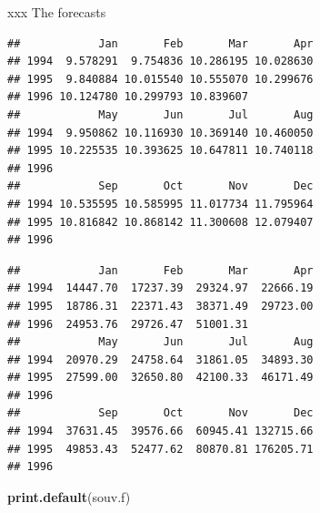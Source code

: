 \documentclass[ignorenonframetext,]{beamer}
\newenvironment{Shaded}{\begin{snugshade}}{\end{snugshade}}
\newcommand{\KeywordTok}[1]{\textcolor[rgb]{0.13,0.29,0.53}{\textbf{#1}}}
\newcommand{\NormalTok}[1]{#1}
\newcommand{\OperatorTok}[1]{\textcolor[rgb]{0.81,0.36,0.00}{\textbf{#1}}}
\begin{document}
\begin{frame}[fragile]{xxx The forecasts}
\begin{Shaded}
\end{Shaded}

\begin{verbatim}
##            Jan       Feb       Mar       Apr
## 1994  9.578291  9.754836 10.286195 10.028630
## 1995  9.840884 10.015540 10.555070 10.299676
## 1996 10.124780 10.299793 10.839607          
##            May       Jun       Jul       Aug
## 1994  9.950862 10.116930 10.369140 10.460050
## 1995 10.225535 10.393625 10.647811 10.740118
## 1996                                        
##            Sep       Oct       Nov       Dec
## 1994 10.535595 10.585995 11.017734 11.795964
## 1995 10.816842 10.868142 11.300608 12.079407
## 1996
\end{verbatim}

\begin{Shaded}
\end{Shaded}

\begin{verbatim}
##            Jan       Feb       Mar       Apr
## 1994  14447.70  17237.39  29324.97  22666.19
## 1995  18786.31  22371.43  38371.49  29723.00
## 1996  24953.76  29726.47  51001.31          
##            May       Jun       Jul       Aug
## 1994  20970.29  24758.64  31861.05  34893.30
## 1995  27599.00  32650.80  42100.33  46171.49
## 1996                                        
##            Sep       Oct       Nov       Dec
## 1994  37631.45  39576.66  60945.41 132715.66
## 1995  49853.43  52477.62  80870.81 176205.71
## 1996
\end{verbatim}

\begin{Shaded}
\begin{Highlighting}[]
\KeywordTok{print.default}\NormalTok{(souv.f)}
\end{Highlighting}
\end{Shaded}


\end{frame}
\end{document}
